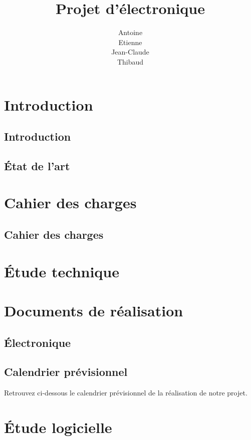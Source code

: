 \documentclass[12pt,titlepage,a4paper]{report}
\title{Projet d'électronique}
\author{Antoine \bsc{Augusti}\\ Etienne \bsc{Batise}\\ Jean-Claude \bsc{Bernard}\\ Thibaud \bsc{Dauce}}
\begin{document}

	\dominitoc
	\tableofcontents

	\setcounter{page}{1}

	
	\part{Introduction}
        \chapter{Introduction}
		

		\chapter{État de l'art}
		


	\part{Cahier des charges}
		\chapter{Cahier des charges}
		


	\part{Étude technique}
		


	\part{Documents de réalisation}
		\chapter{Électronique}
		
	
		\chapter{Calendrier prévisionnel}
		Retrouvez ci-dessous le calendrier prévisionnel de la réalisation de notre projet.
		


	\part{Étude logicielle}
\end{document}
